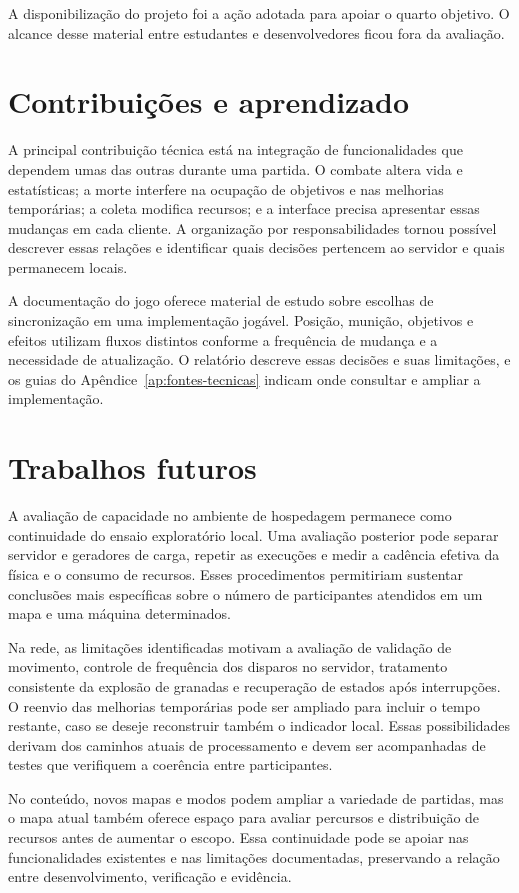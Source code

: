A disponibilização do projeto foi a ação adotada para apoiar o quarto objetivo. O alcance desse material entre estudantes e desenvolvedores ficou fora da avaliação.

\section{Contribuições e aprendizado}\label{sec:6.3}

A principal contribuição técnica está na integração de funcionalidades que dependem umas das outras durante uma partida. O combate altera vida e estatísticas; a morte interfere na ocupação de objetivos e nas melhorias temporárias; a coleta modifica recursos; e a interface precisa apresentar essas mudanças em cada cliente. A organização por responsabilidades tornou possível descrever essas relações e identificar quais decisões pertencem ao servidor e quais permanecem locais.

A documentação do jogo oferece material de estudo sobre escolhas de sincronização em uma implementação jogável. Posição, munição, objetivos e efeitos utilizam fluxos distintos conforme a frequência de mudança e a necessidade de atualização. O relatório descreve essas decisões e suas limitações, e os guias do Apêndice~\ref{ap:fontes-tecnicas} indicam onde consultar e ampliar a implementação.

\section{Trabalhos futuros}\label{sec:6.4}

A avaliação de capacidade no ambiente de hospedagem permanece como continuidade do ensaio exploratório local. Uma avaliação posterior pode separar servidor e geradores de carga, repetir as execuções e medir a cadência efetiva da física e o consumo de recursos. Esses procedimentos permitiriam sustentar conclusões mais específicas sobre o número de participantes atendidos em um mapa e uma máquina determinados.

Na rede, as limitações identificadas motivam a avaliação de validação de movimento, controle de frequência dos disparos no servidor, tratamento consistente da explosão de granadas e recuperação de estados após interrupções. O reenvio das melhorias temporárias pode ser ampliado para incluir o tempo restante, caso se deseje reconstruir também o indicador local. Essas possibilidades derivam dos caminhos atuais de processamento e devem ser acompanhadas de testes que verifiquem a coerência entre participantes.

No conteúdo, novos mapas e modos podem ampliar a variedade de partidas, mas o mapa atual também oferece espaço para avaliar percursos e distribuição de recursos antes de aumentar o escopo. Essa continuidade pode se apoiar nas funcionalidades existentes e nas limitações documentadas, preservando a relação entre desenvolvimento, verificação e evidência.

